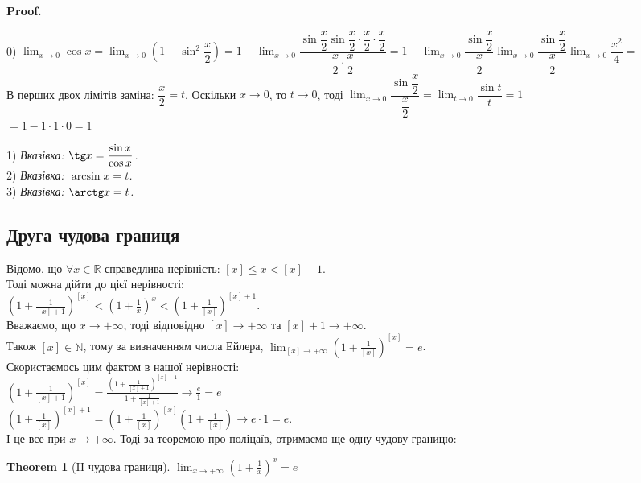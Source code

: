\documentclass[a4paper, 14pt]{article}
\makeatletter
\def\huge{\displaystyle}
\def\qed{$\blacksquare$}
\theoremstyle{theoremdd}
\newtheorem{theorem}{Theorem}[subsection]
\theoremstyle{theoremdd}
\theoremstyle{theoremdd}
\theoremstyle{theoremdd}
\theoremstyle{theoremdd}
\theoremstyle{theoremdd}
\theoremstyle{theoremdd}
\theoremstyle{theoremdd}
\renewenvironment{proof}[1][Proof.\\]{\par
\pushQED{\hfill \qed}%
\normalfont \topsep6\p@\@plus6\p@\relax
\trivlist
\item\relax
{\bfseries
#1\@addpunct{.}}\hspace\labelsep\ignorespaces
}{%
\popQED\endtrivlist\@endpefalse
}
\makeatother
\begin{document}
\begin{proof}
0) $\huge\lim_{x \to 0} \cos x = \lim_{x \to 0} \left( 1-\sin^2 \dfrac{x}{2} \right) = 1 - \lim_{x \to 0} \dfrac{\sin \dfrac{x}{2} \sin \dfrac{x}{2} \cdot \dfrac{x}{2} \cdot \dfrac{x}{2}}{\dfrac{x}{2} \cdot \dfrac{x}{2}} = 1 - \lim_{x \to 0} \dfrac{\sin \dfrac{x}{2}}{\dfrac{x}{2}} \lim_{x \to 0} \dfrac{\sin \dfrac{x}{2}}{\dfrac{x}{2}} \lim_{x \to 0} \dfrac{x^2}{4} \boxed{=}$\\
В перших двох лімітів заміна: $\dfrac{x}{2} = t$. Оскільки $x \to 0$, то $t \to 0$, тоді $\huge\lim_{x \to 0} \dfrac{\sin \dfrac{x}{2}}{\dfrac{x}{2}} = \lim_{t \to 0} \dfrac{\sin t}{t} =1$\\
$\boxed{=} 1 - 1 \cdot 1 \cdot 0 = 1$
\end{proof}

1) \textit{Вказівка: $\tg x = \dfrac{\sin x}{\cos x}$.} \\
2) \textit{Вказівка: $\arcsin x = t$.} \\
3) \textit{Вказівка: $\arctg x = t$.}

\subsection{Друга чудова границя}
Відомо, що $\forall x \in \mathbb{R}$ справедлива нерівність: $[x] \leq x < [x]+1$.\\
Тоді можна дійти до цієї нерівності:\\
$\huge \left(1 + \frac{1}{[x]+1} \right)^{[x]} < \left(1 + \frac{1}{x} \right)^x < \left(1 + \frac{1}{[x]} \right)^{[x]+1}$.\\
Вважаємо, що $x \to +\infty$, тоді відповідно $[x] \to + \infty$ та $[x]+1 \to + \infty$.\\
Також $[x] \in \mathbb{N}$, тому за визначенням числа Ейлера,
$\huge \lim_{[x] \to +\infty} \left(1 + \frac{1}{[x]} \right)^{[x]} = e$.\\
Скористаємось цим фактом в нашої нерівності:\\
$\huge \left(1 + \frac{1}{[x]+1} \right)^{[x]} = \frac{\huge \left(1 + \frac{1}{[x]+1} \right)^{[x]+1}}{\huge 1 + \frac{1}{[x]+1}} \to \frac{e}{1} = e$\\
$\huge \left(1 + \frac{1}{[x]} \right)^{[x]+1} = \left(1 + \frac{1}{[x]} \right)^{[x]} \left(1 + \frac{1}{[x]} \right) \to e \cdot 1 = e$.\\
І це все при $x \to +\infty$. Тоді за теоремою про поліцаїв, отримаємо ще одну чудову границю:
\begin{theorem}[II чудова границя]
$\huge \lim_{x \to +\infty} \left(1 +\frac{1}{x} \right)^x = e$
\end{theorem}
\end{document}

